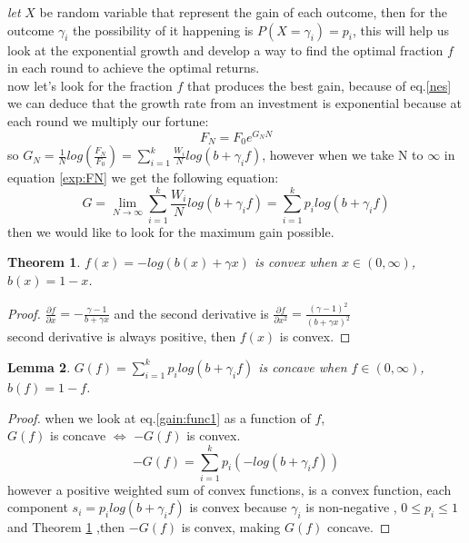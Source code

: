 \documentclass{article}
\newtheorem{thm}{Theorem}[section]
\newtheorem{lem}[thm]{Lemma}
\newcommand{\pdiv}[2]{{\frac{\partial#1}{\partial#2}}}
\begin{document}
	\textit{let} $X$ be random variable that represent the gain of each outcome, then for the outcome $\gamma_i$ the possibility of it happening is $P(X=\gamma_i) = p_i$, this will help us look at the exponential growth and develop a way to find the optimal fraction $f$ in each round to achieve the optimal returns.
	\\
	now let's look for the fraction \(f\) that produces the best gain, because of eq.\ref{nes} we can deduce that the growth rate from an investment is exponential because at each round we multiply our fortune:
	\begin{equation}
		\label{exp:FN}
		F_N = F_0e^{G_{N}N}
	\end{equation}
	so \(G_N = \frac{1}{N}log(\frac{F_N}{F_0}) = \sum_{i=1}^{k} \frac{W_i}{N}log(b + \gamma_i f)\), however when we take N to \(\infty\) in equation \ref{exp:FN} we get the following equation:
	\begin{equation}
		\label{gain:func1}
		G = \lim_{N \to \infty} \sum_{i=1}^{k} \frac{W_i}{N}log(b+\gamma_i f) = \sum_{i=1}^{k} p_i log(b+\gamma_i f)
	\end{equation}
	then we would like to look for the maximum gain possible.
	\newline \newline
	\begin{thm}\label{thm1}
		$f(x) = -log(b(x)+\gamma x)$ is convex when $x\in (0,\infty)$, $b(x) = 1-x$.
	\end{thm}
	\begin{proof}
		$\pdiv{f}{x} = -\frac{\gamma - 1}{b+\gamma x}$ and the second derivative is 
		$\frac{\partial f}{\partial x^2} = \frac{(\gamma -1) ^2}{(b+\gamma x)^2}$\\
		second derivative is always positive, then $f(x)$ is convex.
		\newline
	\end{proof}	
	\begin{lem}
		\label{lem1}
		\(G(f) = \sum_{i=1}^{k} p_i log(b+\gamma_i f)\) is concave when $f\in (0,\infty)$, $b(f) = 1-f$.
	\end{lem}
	\begin{proof}
		when we look at eq.\ref{gain:func1} as a function of $f$,\\
		$G(f)$ is concave $\iff$ $-G(f)$ is convex.
		\[-G(f) = \sum_{i=1}^{k} p_i (-log(b+\gamma_i f))\]
		however a positive weighted sum of convex functions, is a convex function, each component $s_i = p_i log(b+\gamma_i f)$ is convex because $\gamma _i$ is non-negative , $0\le p_i \le 1$ and Theorem \ref{thm1} ,then \(-G(f)\) is convex, making $G(f)$ concave.
		\newline
	\end{proof}
\end{document}
